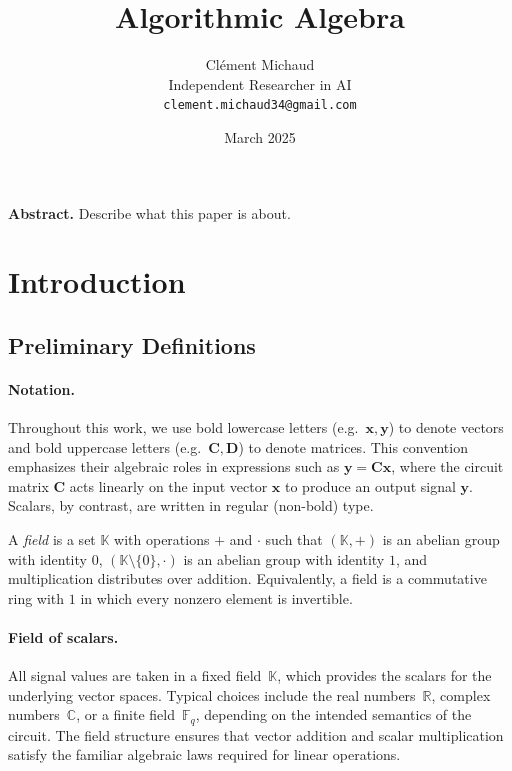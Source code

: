 \documentclass{article}
\title{Algorithmic Algebra}
\author{
Clément Michaud \\
Independent Researcher in AI\\
\texttt{clement.michaud34@gmail.com}
}
\date{March 2025}
\newcommand{\K}{\mathbb{K}}                  %
\newcommand{\vect}[1]{\mathbf{#1}}           %
\newcommand{\mat}[1]{\mathbf{#1}}            %
\begin{document}
\maketitle

\begin{center}
\begin{minipage}{0.9\textwidth}
\small
\textbf{Abstract.} Describe what this paper is about.
\end{minipage}
\end{center}

\vspace{10pt}


\section{Introduction}

\subsection{Preliminary Definitions}

\paragraph{Notation.}
Throughout this work, we use bold lowercase letters (e.g.\ $\vect{x}, \vect{y}$) to denote vectors and bold uppercase letters (e.g.\ $\mat{C}, \mat{D}$) to denote matrices. 
This convention emphasizes their algebraic roles in expressions such as $\vect{y}=\mat{C}\vect{x}$, where the circuit matrix $\mat{C}$ acts linearly on the input vector $\vect{x}$ to produce an output signal $\vect{y}$. 
Scalars, by contrast, are written in regular (non-bold) type.

\begin{definition}[Field]
A \emph{field} is a set \(\K\) with operations \(+\) and \(\cdot\) such that
\((\K,+)\) is an abelian group with identity \(0\), 
\((\K\setminus\{0\},\cdot)\) is an abelian group with identity \(1\), 
and multiplication distributes over addition. 
Equivalently, a field is a commutative ring with \(1\) in which every nonzero element is invertible.
\end{definition}


\paragraph{Field of scalars.}
All signal values are taken in a fixed field~\(\K\), which provides the scalars for the underlying vector spaces. 
Typical choices include the real numbers~\(\mathbb{R}\), complex numbers~\(\mathbb{C}\), or a finite field~\(\mathbb{F}_q\), depending on the intended semantics of the circuit. 
The field structure ensures that vector addition and scalar multiplication satisfy the familiar algebraic laws required for linear operations.
\end{document}
